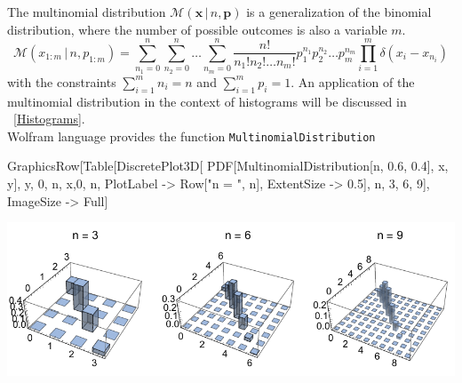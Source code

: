\documentclass{tstextbook}
\begin{document}
\begin{example}
The multinomial distribution $ \mathcal{M}(\mathbf{x}\,\vert\, n,\mathbf{p})$ is a generalization of the binomial distribution, where the number of possible outcomes is also a variable $m$.  
  \begin{equation}
    \mathcal{M}(x_{1:m}\,\vert\, n,p_{1:m})=\sum_{n_1=0}^n\sum_{n_2=0}^n\ldots \sum_{n_m=0}^n \frac{n!}{n_1!n_2!\ldots n_m!}p_1^{n_1}p_2^{n_2}\ldots p_m^{n_m}\prod_{i=1}^m\delta(x_i-x_{n_i})
  \end{equation}
with the constraints $\sum_{i=1}^{m}n_i=n$ and $\sum_{i=1}^{m}p_i=1$. An application of the multinomial distribution in the context of histograms will be discussed in ~\ref{Histograms}.\\

Wolfram language provides the function \texttt{MultinomialDistribution}

\begin{mathematica}
GraphicsRow[Table[DiscretePlot3D[
   PDF[MultinomialDistribution[n, {0.6, 0.4}], {x, y}],
   {y, 0, n}, {x,0, n}, PlotLabel -> Row[{"n = ", n}], 
   ExtentSize -> 0.5], {n, {3, 6, 9}}], ImageSize -> Full]
\end{mathematica}
\includegraphics[scale=0.9]{images/multinomial_distribution.pdf}  
\end{example}
\end{document}
